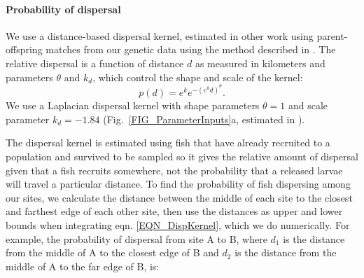 \documentclass[12pt, oneside]{article}   	%
\begin{document}

\paragraph*{Probability of dispersal}

We use a distance-based dispersal kernel, estimated in other work using parent-offspring matches from our genetic data \citep{catalanoInPrepconnectivity} using the method described in \cite{bode2018estimating}. The relative dispersal is a function of distance $d$ as measured in kilometers and parameters $\theta$ and $k_d$, which control the shape and scale of the kernel:
\begin{equation}
p(d) = e^k e^{-(e^k d)^\theta}. \label{EQN_DispKernel}
\end{equation}
We use a Laplacian dispersal kernel with shape parameters $\theta = 1$ and scale parameter $k_d = -1.84$ (Fig.\ \ref{FIG_ParameterInputs}a, estimated in \citep{catalanoInPrepconnectivity}).

The dispersal kernel is estimated using fish that have already recruited to a population and survived to be sampled so it gives the relative amount of dispersal given that a fish recruits somewhere, not the probability that a released larvae will travel a particular distance. To find the probability of fish dispersing among our sites, we calculate the distance between the middle of each site to the closest and farthest edge of each other site, then use the distances as upper and lower bounds when integrating eqn. \ref{EQN_DispKernel}, which we do numerically. For example, the probability of dispersal from site A to B, where $d_1$ is the distance from the middle of A to the closest edge of B and $d_2$ is the distance from the middle of A to the far edge of B, is:

\end{document}
